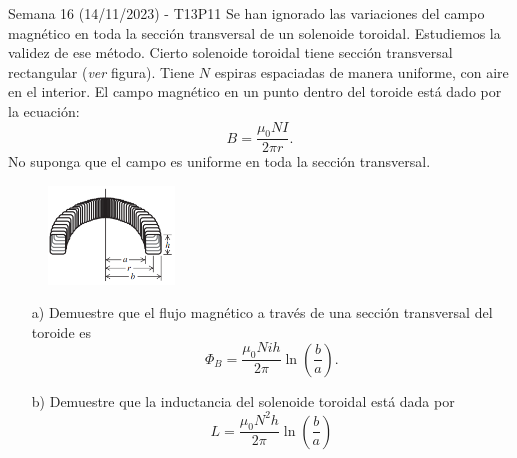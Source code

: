 \begin{frame}{Semana 16 (14/11/2023) - T13P11}
\tiny
    Se han ignorado las variaciones del campo
magnético en toda la sección transversal de un solenoide toroidal.
Estudiemos la validez de ese método. Cierto solenoide toroidal tiene
sección transversal rectangular (\textit{ver} figura). Tiene $N$ espiras espaciadas de manera uniforme, con aire
en el interior. El campo magnético en un punto dentro del toroide está dado por la ecuación: $$B=\frac{\mu_0NI}{2\pi r}.$$ No suponga que el campo es uniforme
en toda la sección transversal.

\begin{figure}
        \centering
        \includegraphics[width=0.3\textwidth]{figures/t15p10.png}
    \end{figure}

\begin{itemize}
    \item[a)] Demuestre que el flujo magnético a
través de una sección transversal del toroide es $$\Phi_B=\frac{\mu_0Nih}{2\pi}\ln\left(\frac{b}{a}\right).$$
\item[b)] Demuestre que la inductancia del solenoide toroidal está dada por $$L=\frac{\mu_0N^2h}{2\pi}\ln\left(\frac{b}{a}\right)$$
\end{itemize}

\end{frame}